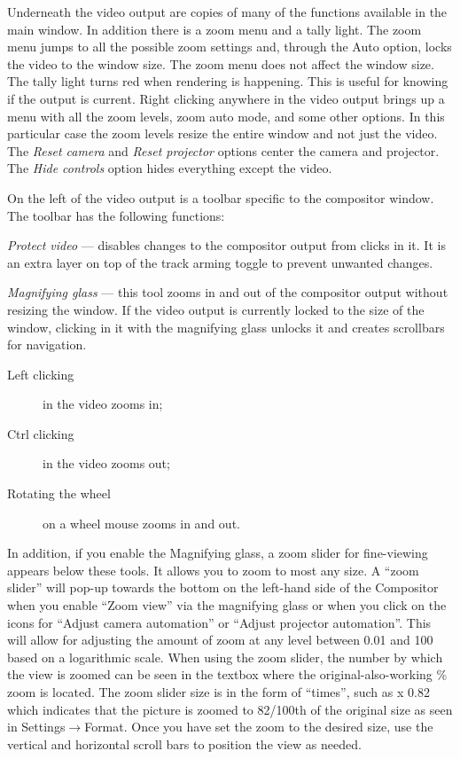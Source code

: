 Underneath the video output are copies of many of the functions available in the main window. 
In addition there is a zoom menu and a tally light. 
The zoom menu jumps to all the possible zoom settings and, through the Auto option, locks the video to the window size. 
The zoom menu does not affect the window size. 
The tally light turns red when rendering is happening. This is useful for knowing if the output is current. 
Right clicking anywhere in the video output brings up a menu with all the zoom levels, zoom auto mode, and some other options. 
In this particular case the zoom levels resize the entire window and not just the video. 
The \emph{Reset camera} and \emph{Reset projector} options center the camera and projector. 
The \emph{Hide controls} option hides everything except the video. 

On the left of the video output is a toolbar specific to the compositor window. The toolbar has the following functions:

\emph{Protect video} --- disables changes to the compositor output from clicks in it. It is an extra layer on top of the track arming toggle to prevent unwanted changes.

\emph{Magnifying glass} --- this tool zooms in and out of the compositor output without resizing the window. If the video output is currently locked to the size of the window, clicking in it with the magnifying glass unlocks it and creates scrollbars for navigation.

\begin{description}
    \item[Left clicking] in the video zooms in;
    \item[Ctrl clicking] in the video zooms out;
    \item[Rotating the wheel] on a wheel mouse zooms in and out.
\end{description}

In addition, if you enable the Magnifying glass, a zoom slider for fine-viewing appears below these tools.  
It allows you to zoom to most any size. 
A “zoom slider” will pop-up towards the bottom on the left-hand side of the Compositor when you enable “Zoom view” via the magnifying glass or when you click on the icons for “Adjust camera automation” or “Adjust projector automation”.  
This will allow for adjusting the amount of zoom at any level between 0.01 and 100 based on a logarithmic scale.  
When using the zoom slider, the number by which the view is zoomed can be seen in the textbox where the original-also-working \% zoom is located.  
The zoom slider size is in the form of “times”, such as x 0.82 which indicates that the picture is zoomed to 82/100th of the original size as seen in Settings$\rightarrow$Format.  
Once you have set the zoom to the desired size, use the vertical and horizontal scroll bars to position the view as needed.

